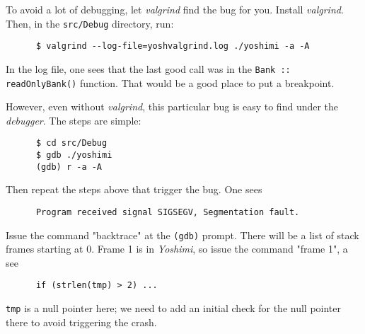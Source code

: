    To avoid a lot of debugging, let \textsl{valgrind} find the bug for you.
   Install \textsl{valgrind}.  Then, in the \texttt{src/Debug} directory,
   run:

   \begin{verbatim}
      $ valgrind --log-file=yoshvalgrind.log ./yoshimi -a -A
   \end{verbatim}

   In the log file, one sees that the last good call was in the
   \texttt{Bank :: readOnlyBank()} function.  That would be a good place to
   put a breakpoint.

   However, even without \textsl{valgrind}, this particular bug is easy to
   find under the \textsl{debugger}.  The steps are simple:

   \begin{verbatim}
      $ cd src/Debug
      $ gdb ./yoshimi
      (gdb) r -a -A
   \end{verbatim}

   Then repeat the steps above that trigger the bug.
   One sees

   \begin{verbatim}
      Program received signal SIGSEGV, Segmentation fault.
   \end{verbatim}

   Issue the command "backtrace" at the \texttt{(gdb)} prompt.  There will
   be a list of stack frames starting at 0.  Frame 1 is in \textsl{Yoshimi},
   so issue the command "frame 1", a see

   \begin{verbatim}
      if (strlen(tmp) > 2) ...
   \end{verbatim}

   \texttt{tmp} is a null pointer here; we need to add an initial check for
   the null pointer there to avoid triggering the crash.


